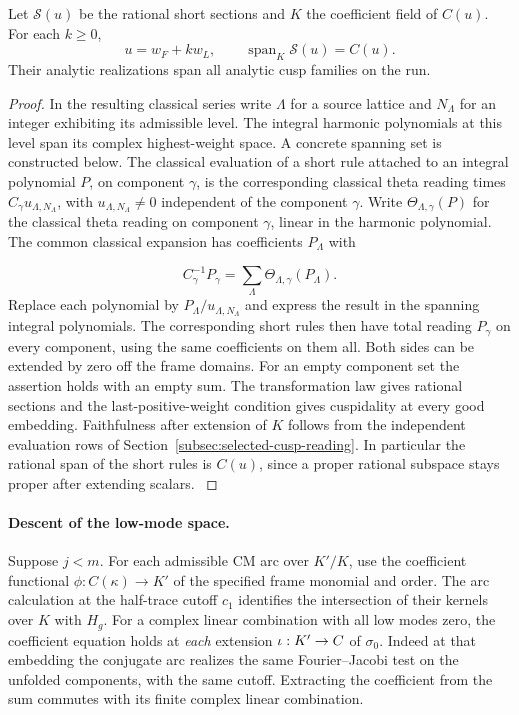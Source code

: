 

\begin{proposition}\label{prop:shifted-rational-cusp-span}
Let \(\mathcal S(u)\) be the rational short sections and \(K\) the coefficient field of \(C(u)\). For each \(k\ge0\),
\[
 u=w_F+k w_L,\qquad \operatorname{span}_K\mathcal S(u)=C(u).
\]
Their analytic realizations span all analytic cusp families on the run.
\end{proposition}

\begin{proof}
In the resulting classical series write \(\Lambda\) for a source
lattice and \(N_\Lambda\) for an integer exhibiting its admissible
level. The integral harmonic polynomials at this level span its
complex highest-weight space. A concrete spanning set is constructed
below. The classical evaluation of a short rule attached to an
integral polynomial \(P\), on component \(\gamma\), is the corresponding
classical theta reading times \(C_\gamma u_{\Lambda,N_\Lambda}\), with
\(u_{\Lambda,N_\Lambda}\ne0\) independent of the component \(\gamma\). Write \(\Theta_{\Lambda,\gamma}(P)\) for the classical theta
reading on component \(\gamma\), linear in the harmonic polynomial.
The common classical expansion has coefficients \(P_\Lambda\) with

\[
  C_\gamma^{-1}P_\gamma=\sum_\Lambda\Theta_{\Lambda,\gamma}(P_\Lambda).
\]
Replace each polynomial by \(P_\Lambda/u_{\Lambda,N_\Lambda}\)
and express the result in the spanning integral polynomials.
The corresponding short rules then have total reading \(P_\gamma\)
on every component, using the same coefficients on them all. Both sides can be
extended by zero off the frame domains. For an empty component set
the assertion holds with an empty sum. The transformation law
gives rational sections and the last-positive-weight condition
gives cuspidality at every good embedding. Faithfulness after
extension of \(K\) follows from the independent evaluation rows of
Section~\ref{subsec:selected-cusp-reading}. In particular the rational
span of the short rules is \(C(u)\), since a proper rational
subspace stays proper after extending scalars.
\label{cor:slice-shifted-theta-2}

\end{proof}

\paragraph{Descent of the low-mode space.}\label{par:shifted-good}
Suppose \(j<m\). For each admissible CM arc over \(K'/K\), use the
coefficient functional \(\phi:C(\kappa)\to K'\) of the specified
frame monomial and order. The arc calculation at the half-trace
cutoff \(c_1\) identifies the intersection of their kernels over
\(K\) with \(H_g\). For a complex linear combination with all low
modes zero, the coefficient equation holds at \emph{each} extension
\(\iota:K'\to C\) of \(\sigma_0\). Indeed at that embedding the
conjugate arc realizes the same Fourier--Jacobi test on the unfolded
components, with the same cutoff. Extracting the coefficient from
the sum commutes with its finite complex linear combination.

